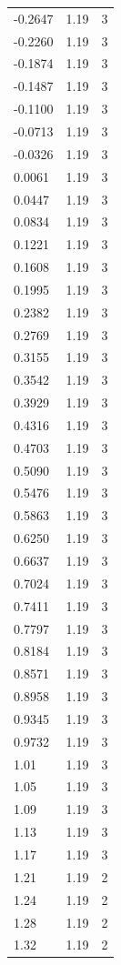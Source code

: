 \begin{longtable}{lrr}
  -0.2647 & 1.19 & 3 \\
  -0.2260 & 1.19 & 3 \\
  -0.1874 & 1.19 & 3 \\
  -0.1487 & 1.19 & 3 \\
  -0.1100 & 1.19 & 3 \\
  -0.0713 & 1.19 & 3 \\
  -0.0326 & 1.19 & 3 \\
  0.0061 & 1.19 & 3 \\
  0.0447 & 1.19 & 3 \\
  0.0834 & 1.19 & 3 \\
  0.1221 & 1.19 & 3 \\
  0.1608 & 1.19 & 3 \\
  0.1995 & 1.19 & 3 \\
  0.2382 & 1.19 & 3 \\
  0.2769 & 1.19 & 3 \\
  0.3155 & 1.19 & 3 \\
  0.3542 & 1.19 & 3 \\
  0.3929 & 1.19 & 3 \\
  0.4316 & 1.19 & 3 \\
  0.4703 & 1.19 & 3 \\
  0.5090 & 1.19 & 3 \\
  0.5476 & 1.19 & 3 \\
  0.5863 & 1.19 & 3 \\
  0.6250 & 1.19 & 3 \\
  0.6637 & 1.19 & 3 \\
  0.7024 & 1.19 & 3 \\
  0.7411 & 1.19 & 3 \\
  0.7797 & 1.19 & 3 \\
  0.8184 & 1.19 & 3 \\
  0.8571 & 1.19 & 3 \\
  0.8958 & 1.19 & 3 \\
  0.9345 & 1.19 & 3 \\
  0.9732 & 1.19 & 3 \\
  1.01 & 1.19 & 3 \\
  1.05 & 1.19 & 3 \\
  1.09 & 1.19 & 3 \\
  1.13 & 1.19 & 3 \\
  1.17 & 1.19 & 3 \\
  1.21 & 1.19 & 2 \\
  1.24 & 1.19 & 2 \\
  1.28 & 1.19 & 2 \\
  1.32 & 1.19 & 2 \\

\end{longtable}
